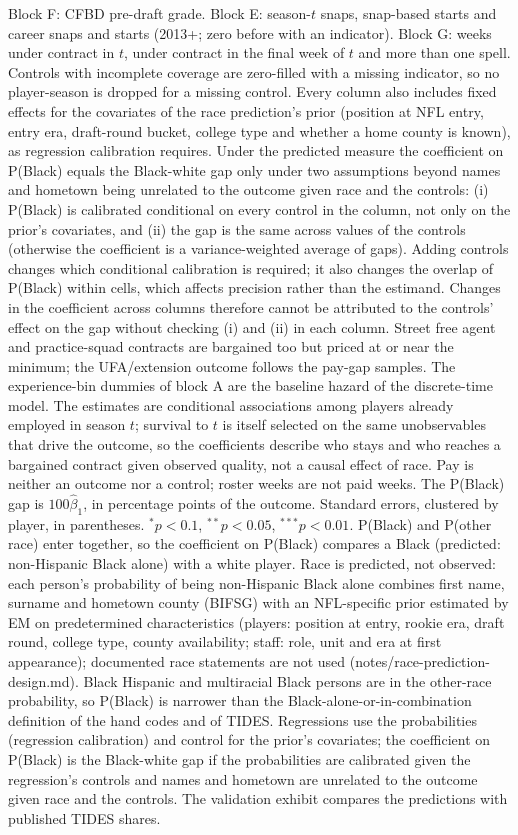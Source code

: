 {Block F: CFBD pre-draft grade. Block E: season-$t$ snaps, snap-based starts and career snaps and starts (2013+; zero before with an indicator). Block G: weeks under contract in $t$, under contract in the final week of $t$ and more than one spell. Controls with incomplete coverage are zero-filled with a missing indicator, so no player-season is dropped for a missing control. Every column also includes fixed effects for the covariates of the race prediction's prior (position at NFL entry, entry era, draft-round bucket, college type and whether a home county is known), as regression calibration requires. Under the predicted measure the coefficient on P(Black) equals the Black-white gap only under two assumptions beyond names and hometown being unrelated to the outcome given race and the controls: (i) P(Black) is calibrated conditional on every control in the column, not only on the prior's covariates, and (ii) the gap is the same across values of the controls (otherwise the coefficient is a variance-weighted average of gaps). Adding controls changes which conditional calibration is required; it also changes the overlap of P(Black) within cells, which affects precision rather than the estimand. Changes in the coefficient across columns therefore cannot be attributed to the controls' effect on the gap without checking (i) and (ii) in each column. Street free agent and practice-squad contracts are bargained too but priced at or near the minimum; the UFA/extension outcome follows the pay-gap samples. The experience-bin dummies of block A are the baseline hazard of the discrete-time model. The estimates are conditional associations among players already employed in season $t$; survival to $t$ is itself selected on the same unobservables that drive the outcome, so the coefficients describe who stays and who reaches a bargained contract given observed quality, not a causal effect of race. Pay is neither an outcome nor a control; roster weeks are not paid weeks. The P(Black) gap is $100\hat\beta_1$, in percentage points of the outcome. Standard errors, clustered by player, in parentheses. $^{*}p<0.1$, $^{**}p<0.05$, $^{***}p<0.01$. P(Black) and P(other race) enter together, so the coefficient on P(Black) compares a Black (predicted: non-Hispanic Black alone) with a white player. Race is predicted, not observed: each person's probability of being non-Hispanic Black alone combines first name, surname and hometown county (BIFSG) with an NFL-specific prior estimated by EM on predetermined characteristics (players: position at entry, rookie era, draft round, college type, county availability; staff: role, unit and era at first appearance); documented race statements are not used (notes/race-prediction-design.md). Black Hispanic and multiracial Black persons are in the other-race probability, so P(Black) is narrower than the Black-alone-or-in-combination definition of the hand codes and of TIDES. Regressions use the probabilities (regression calibration) and control for the prior's covariates; the coefficient on P(Black) is the Black-white gap if the probabilities are calibrated given the regression's controls and names and hometown are unrelated to the outcome given race and the controls. The validation exhibit compares the predictions with published TIDES shares.
\par}

